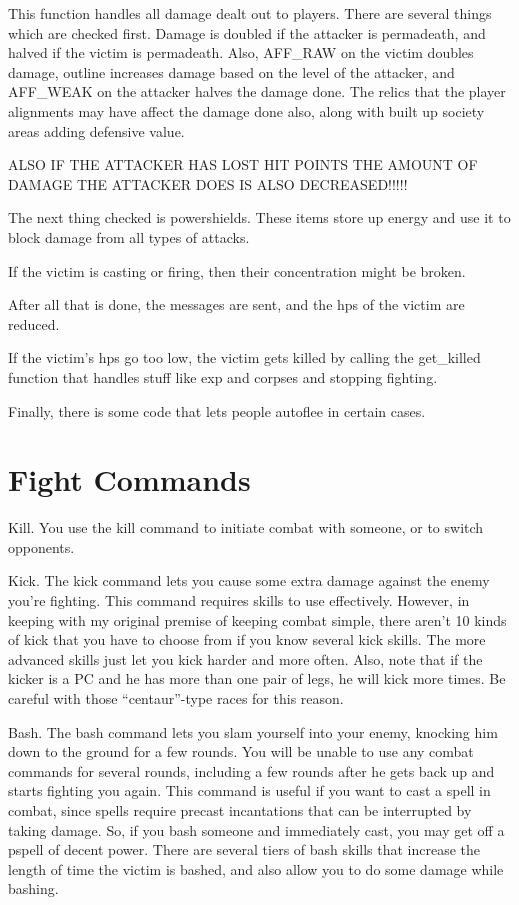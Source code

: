 This function handles all damage dealt out to players. There are
several things which are checked first.  Damage is doubled if the
attacker is permadeath, and halved if the victim is permadeath. Also,
AFF\_RAW on the victim doubles damage, outline increases damage based
on the level of the attacker, and AFF\_WEAK on the attacker halves the
damage done. The relics that the player alignments may have affect the
damage done also, along with built up society areas adding defensive
value. 

ALSO IF THE ATTACKER HAS LOST HIT POINTS THE AMOUNT OF DAMAGE THE
ATTACKER DOES IS ALSO DECREASED!!!!!

The next thing checked is powershields. These items store up
energy and use it to block damage from all types of
attacks. 

If the victim is casting or firing, then their concentration might be broken.


After all that is done, the messages are sent, and the hps of the victim
are reduced.

If the victim's hps go too low, the victim gets killed by calling the
get\_killed function that handles stuff like exp and corpses and stopping
fighting. 

Finally, there is some code that lets people autoflee in certain
cases.

\section{Fight Commands}

\bul Kill. You use the kill command to initiate combat with someone,
or to switch opponents. 

\bul Kick. The kick command lets you cause some extra damage against the
enemy you're fighting. This command requires skills to use
effectively. However, in keeping with my original premise of keeping
combat simple, there aren't 10 kinds of kick that you have to choose
from if you know several kick skills. The more advanced skills just
let you kick harder and more often. Also, note that if the kicker is a
PC and he has more than one pair of legs, he will kick more times. Be
careful with those ``centaur''-type races for this reason.


\bul Bash. The bash command lets you slam yourself into your enemy,
knocking him down to the ground for a few rounds. You will be unable
to use any combat commands for several rounds, including a few rounds
after he gets back up and starts fighting you again. This command is
useful if you want to cast a spell in combat, since spells require
precast incantations that can be interrupted by taking damage. So, if
you bash someone and immediately cast, you may get off a pspell of
decent power. There are several tiers of bash skills that increase the
length of time the victim is bashed, and also allow you to do some
damage while bashing.


